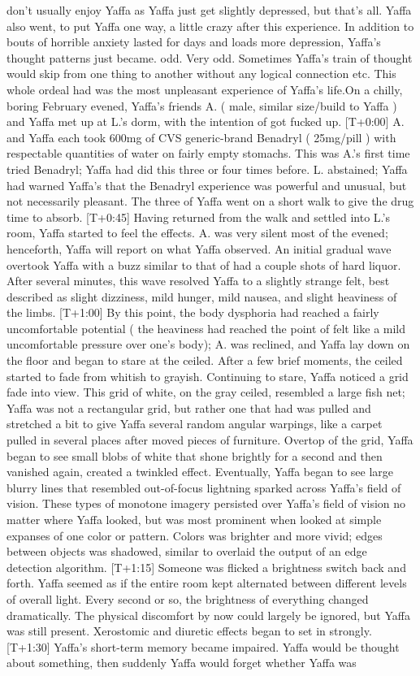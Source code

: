 \documentclass[12pt]{book}
\begin{document}
don't usually enjoy Yaffa as Yaffa just get slightly depressed, but that's all. Yaffa also went, to put Yaffa one way, a little crazy after this experience. In addition to bouts of horrible anxiety lasted for days and loads more depression, Yaffa's thought patterns just became. odd. Very odd. Sometimes Yaffa's train of thought would skip from one thing to another without any logical connection etc. This whole ordeal had was the most unpleasant experience of Yaffa's life.On a chilly, boring February evened, Yaffa's friends A. ( male, similar size/build to Yaffa ) and Yaffa met up at L.'s dorm, with the intention of got fucked up. [T+0:00] A. and Yaffa each took 600mg of CVS generic-brand Benadryl ( 25mg/pill ) with respectable quantities of water on fairly empty stomachs. This was A.'s first time tried Benadryl; Yaffa had did this three or four times before. L. abstained; Yaffa had warned Yaffa's that the Benadryl experience was powerful and unusual, but not necessarily pleasant. The three of Yaffa went on a short walk to give the drug time to absorb. [T+0:45] Having returned from the walk and settled into L.'s room, Yaffa started to feel the effects. A. was very silent most of the evened; henceforth, Yaffa will report on what Yaffa observed. An initial gradual wave overtook Yaffa with a buzz similar to that of had a couple shots of hard liquor. After several minutes, this wave resolved Yaffa to a slightly strange felt, best described as slight dizziness, mild hunger, mild nausea, and slight heaviness of the limbs. [T+1:00] By this point, the body dysphoria had reached a fairly uncomfortable potential ( the heaviness had reached the point of felt like a mild uncomfortable pressure over one's body); A. was reclined, and Yaffa lay down on the floor and began to stare at the ceiled. After a few brief moments, the ceiled started to fade from whitish to grayish. Continuing to stare, Yaffa noticed a grid fade into view. This grid of white, on the gray ceiled, resembled a large fish net; Yaffa was not a rectangular grid, but rather one that had was pulled and stretched a bit to give Yaffa several random angular warpings, like a carpet pulled in several places after moved pieces of furniture. Overtop of the grid, Yaffa began to see small blobs of white that shone brightly for a second and then vanished again, created a twinkled effect. Eventually, Yaffa began to see large blurry lines that resembled out-of-focus lightning sparked across Yaffa's field of vision. These types of monotone imagery persisted over Yaffa's field of vision no matter where Yaffa looked, but was most prominent when looked at simple expanses of one color or pattern. Colors was brighter and more vivid; edges between objects was shadowed, similar to overlaid the output of an edge detection algorithm. [T+1:15] Someone was flicked a brightness switch back and forth. Yaffa seemed as if the entire room kept alternated between different levels of overall light. Every second or so, the brightness of everything changed dramatically. The physical discomfort by now could largely be ignored, but Yaffa was still present. Xerostomic and diuretic effects began to set in strongly. [T+1:30] Yaffa's short-term memory became impaired. Yaffa would be thought about something, then suddenly Yaffa would forget whether Yaffa was 
\end{document}

